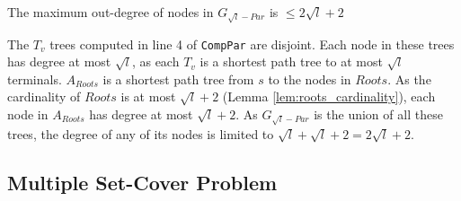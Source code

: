 



\begin{Lem}
  \label{lem:roots_size}
The maximum out-degree of nodes in $G_{\sqrt{l}-Par}$ is $\leq 2\sqrt{l} + 2$
\end{Lem}
\begin{Proof}
The $T_v$ trees computed in line 4 of \verb|CompPar| are disjoint. Each node in these trees has degree at most $\sqrt{l}$,
as each $T_v$ is a shortest path tree to at most $\sqrt{l}$ terminals. $A_{Roots}$ is a shortest path tree from $s$ to the nodes in $Roots$. 
As the cardinality of $Roots$ is at most $\sqrt{l} + 2$ (Lemma \ref{lem:roots_cardinality}), each node in $A_{Roots}$
has degree at most $\sqrt{l} + 2$. As $G_{\sqrt{l}-Par}$ is the union of all these trees, the degree of any of its nodes is limited to $\sqrt{l} + \sqrt{l} + 2 = 2\sqrt{l} + 2$.
\end{Proof}


\subsection{Multiple Set-Cover Problem}
\label{sec:msc_definition}

